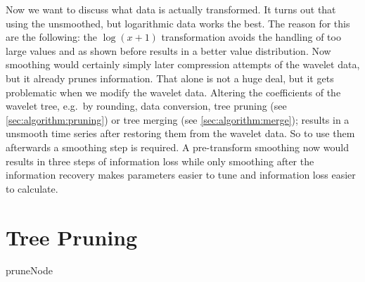 Now we want to discuss what data is actually transformed. It turns out that using the unsmoothed, but logarithmic data works the best. The reason for this are the following: the $\log(x + 1)$ transformation avoids the handling of too large values and as shown before results in a better value distribution. Now smoothing would certainly simply later compression attempts of the wavelet data, but it already prunes information. That alone is not a huge deal, but it gets problematic when we modify the wavelet data. Altering the coefficients of the wavelet tree, e.g.\ by rounding, data conversion, tree pruning (see \autoref{sec:algorithm:pruning}) or tree merging (see \autoref{sec:algorithm:merge}); results in a unsmooth time series after restoring them from the wavelet data. So to use them afterwards a smoothing step is required. A pre-transform smoothing now would results in three steps of information loss while only smoothing after the information recovery makes parameters easier to tune and information loss easier to calculate.



\section{Tree Pruning}
\label{sec:algorithm:pruning}

\begin{algorithm}



    \caption{pruneNode}\label{algo:pruneNode}
\end{algorithm}

